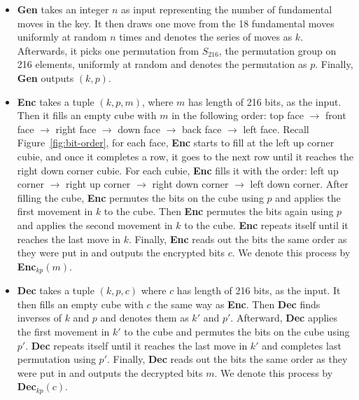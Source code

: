 \begin{itemize}
    \item \textbf{Gen} takes an integer $n$ as input representing the number of fundamental moves in the key. It then draws one move from the 18 fundamental moves uniformly at random $n$ times and denotes the series of moves as $k$. Afterwards, it picks one permutation from $S_{216}$, the permutation group on 216 elements, uniformly at random and denotes the permutation as $p$. Finally, \textbf{Gen} outputs $(k, p)$.
    
    \item \textbf{Enc} takes a tuple $(k, p, m)$, where $m$ has length of 216 bits, as the input. Then it fills an empty cube with $m$ in the following order: top face $\rightarrow$ front face $\rightarrow$ right face $\rightarrow$ down face $\rightarrow$ back face $\rightarrow$ left face. Recall Figure~\ref{fig:bit-order}, for each face, \textbf{Enc} starts to fill at the left up corner cubie, and once it completes a row, it goes to the next row until it reaches the right down corner cubie. For each cubie, \textbf{Enc} fills it with the order: left up corner $\rightarrow$ right up corner $\rightarrow$ right down corner $\rightarrow$ left down corner. After filling the cube, \textbf{Enc} permutes the bits on the cube using $p$ and applies the first movement in $k$ to the cube. Then \textbf{Enc} permutes the bits again using $p$ and applies the second movement in $k$ to the cube. \textbf{Enc} repeats itself until it reaches the last move in $k$. Finally, \textbf{Enc} reads out the bits the same order as they were put in and outputs the encrypted bits $c$. We denote this process by \textbf{Enc}$_{kp}(m)$.
    
    \item \textbf{Dec} takes a tuple $(k, p, c)$ where $c$ has length of 216 bits, as the input. It then fills an empty cube with $c$ the same way as \textbf{Enc}. Then \textbf{Dec} finds inverses of $k$ and $p$ and denotes them as $k'$ and $p'$. Afterward, \textbf{Dec} applies the first movement in $k'$ to the cube and permutes the bits on the cube using $p'$. \textbf{Dec} repeats itself until it reaches the last move in $k'$ and completes last permutation using $p'$. Finally, \textbf{Dec} reads out the bits the same order as they were put in and outputs the decrypted bits $m$. We denote this process by \textbf{Dec}$_{kp}(c)$.
\end{itemize}
